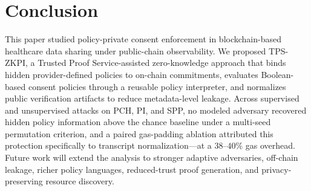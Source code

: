\section{Conclusion}
\label{sec:conclusion}

This paper studied policy-private consent enforcement in blockchain-based
healthcare data sharing under public-chain observability. We proposed TPS-ZKPI,
a Trusted Proof Service-assisted zero-knowledge approach that binds hidden
provider-defined policies to on-chain commitments, evaluates Boolean-based consent
policies through a reusable policy interpreter, and normalizes public
verification artifacts to reduce metadata-level leakage. Across supervised and
unsupervised attacks on PCH, PI, and SPP, no modeled adversary recovered hidden
policy information above the chance baseline under a multi-seed permutation
criterion, and a paired gas-padding ablation attributed this protection
specifically to transcript normalization---at a $38$--$40\%$ gas overhead.
Future work will extend the analysis to stronger adaptive adversaries, off-chain
leakage, richer policy languages, reduced-trust proof generation, and privacy-preserving
resource discovery.
